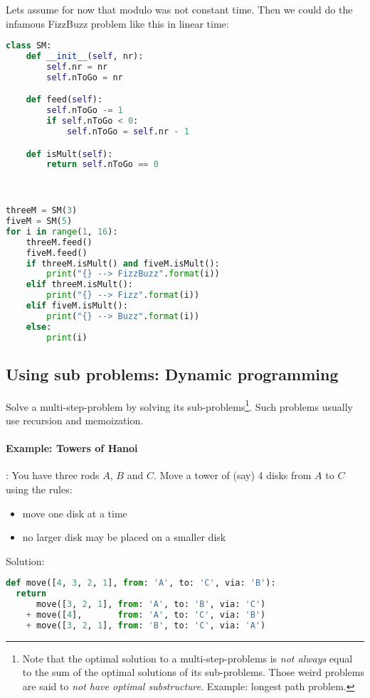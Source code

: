 Lets assume for now that modulo was not constant time. Then we could do the infamous FizzBuzz problem like this in linear time: 

\begin{lstlisting}[language=python]
class SM:
    def __init__(self, nr):
        self.nr = nr
        self.nToGo = nr

    def feed(self):
        self.nToGo -= 1
        if self.nToGo < 0:
            self.nToGo = self.nr - 1

    def isMult(self):
        return self.nToGo == 0



threeM = SM(3)
fiveM = SM(5)
for i in range(1, 16):
    threeM.feed()
    fiveM.feed()
    if threeM.isMult() and fiveM.isMult():
        print("{} --> FizzBuzz".format(i))
    elif threeM.isMult():
        print("{} --> Fizz".format(i))
    elif fiveM.isMult():
        print("{} --> Buzz".format(i))
    else:
        print(i)
\end{lstlisting}

\subsection{Using sub problems: Dynamic programming}
Solve a multi-step-problem by solving its sub-problems\footnote{Note that the optimal solution to a multi-step-problems is \emph{not always} equal to the sum of the optimal solutions of its sub-problems. Those weird problems are said to \emph{not have optimal substructure}. Example: longest path problem.}. 
Such problems usually use recursion and memoization.

\paragraph{Example: Towers of Hanoi}: You have three rods $A$, $B$ and $C$. Move a tower of (say) 4 disks from $A$ to $C$ using the rules:
\begin{itemize}
  \item move one disk at a time
  \item no larger disk may be placed on a smaller disk
\end{itemize}

Solution:
\begin{lstlisting}[language=python]
def move([4, 3, 2, 1], from: 'A', to: 'C', via: 'B'):
  return 
      move([3, 2, 1], from: 'A', to: 'B', via: 'C')
    + move([4],       from: 'A', to: 'C', via: 'B')
    + move([3, 2, 1], from: 'B', to: 'C', via: 'A')
\end{lstlisting}


